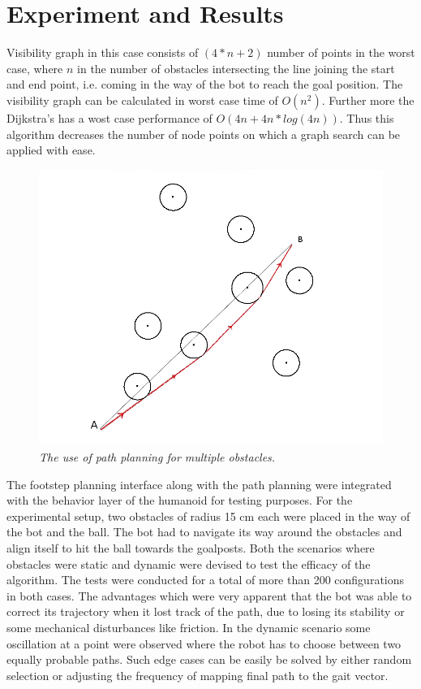 \documentclass[letterpaper, 10 pt, conference]{ieeeconf}  %
\begin{document}
\section{Experiment and Results}
Visibility graph in this case consists of $(4*n+2)$ number of points in the worst case, where $n$ in the number of obstacles intersecting the line joining the start and end point, i.e. coming in the way of the bot to reach the goal position. The visibility graph can be calculated in worst case time of $O(n^2)$. Further more the Dijkstra's has a wost case performance of $O(4n+4n*log(4n))$. Thus this algorithm decreases the number of node points on which a graph search can be applied with ease. \\
\begin{figure}[h]  
\begin{center}  
\includegraphics[scale=0.3]{test1.JPG}  
\caption{\small \sl The use of path planning for multiple obstacles. \label{fig:test}}  
\end{center}  
\end{figure}
The footstep planning interface along with the path planning were integrated with the behavior layer of the humanoid for testing purposes. For the experimental setup, two obstacles of radius 15 cm each were placed in the way of the bot and the ball. The bot had to navigate its way around the obstacles and align itself to hit the ball towards the goalposts. Both the scenarios where obstacles were static and dynamic were devised to test the efficacy of the algorithm. The tests were conducted for a total of more than 200 configurations in both cases. The advantages which were very apparent that the bot was able to correct its trajectory when it lost track of the path, due to losing its stability or some mechanical disturbances like friction. In the dynamic scenario some oscillation at a point were observed where the robot has to choose between two equally probable paths. Such edge cases can be easily be solved by either random selection or adjusting the frequency of mapping final path to the gait vector.\\
\end{document}
